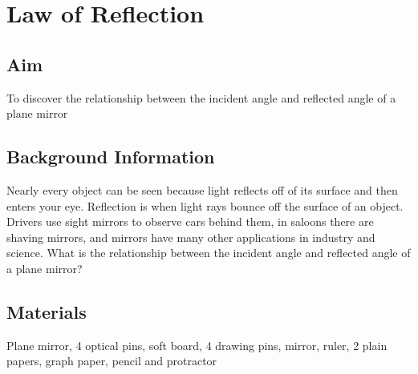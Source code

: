 \chapter{Law of Reflection}

\section{Aim}
To discover the relationship between the incident angle and reflected angle of a plane mirror

\section{Background Information}
Nearly every object can be seen because light reflects off of its surface and then enters your eye. Reflection is when light rays bounce off the surface of an object. Drivers use sight mirrors to observe cars behind them, in saloons there are shaving mirrors, and mirrors have many other applications in industry and science. What is the relationship between the incident angle and reflected angle of a plane mirror? 

\section{Materials}
Plane mirror, 4 optical pins, soft board, 4 drawing pins, mirror, ruler, 2 plain papers, graph paper, pencil and protractor

